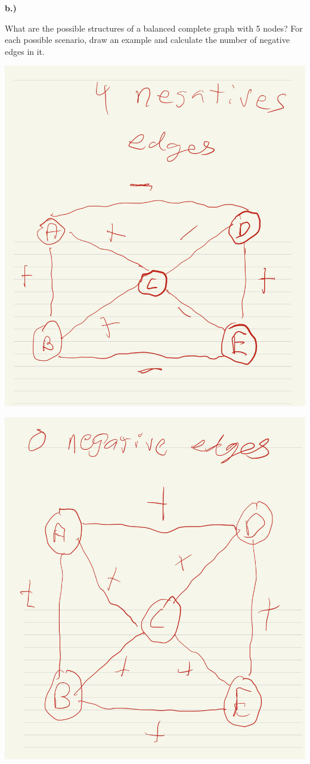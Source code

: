 \documentclass[
]{article}
\begin{document}
\textbf{b.)}

What are the possible structures of a balanced complete graph with 5
nodes? For each possible scenario, draw an example and calculate the
number of negative edges in it.

\includegraphics{graph6.jpg}

\includegraphics{graph7.jpg}
\end{document}
